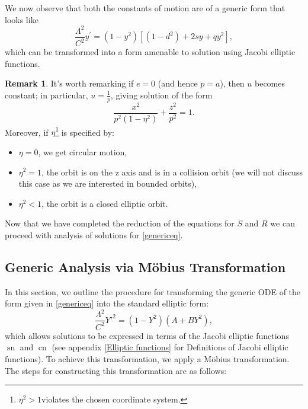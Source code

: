 \documentclass[12pt,oneside]{report}
\theoremstyle{definition}
\newtheorem{remark}{Remark}
\begin{document}
We now observe that both the constants of motion are of a generic form that looks like 
\begin{equation}\label{genericeq}
    \frac{\Lambda^{2}}{C^{2}}{y}^{\prime} = (1-y^{2}) \left[(1-d^{2})+2sy+qy^{2} \right],
\end{equation}
which can be transformed into a form amenable to solution using Jacobi elliptic functions.
\begin{remark}
    It's worth remarking if $e = 0$ (and hence $p=a$), then $u$ becomes constant; in particular, $u=\frac{1}{p}$, giving solution of the form
    $$\frac{x^{2}}{p^{2}(1-\eta^{2})}+\frac{z^{2}}{p^{2}} = 1 .$$
   Moreover, if $\eta$\footnote{$\eta^{2}>1$violates the chosen coordinate system.} is specified by:
    \begin{itemize}
        \item $\eta =0$, we get circular motion,
        \item $\eta^{2} =1$,  the orbit is on the z axis and is in a collision orbit (we will not discuss this case as we are interested in bounded orbits),
        \item $\eta^{2} < 1$, the orbit is a closed elliptic orbit.
    \end{itemize}
    

\end{remark}

Now that we have completed the reduction of the equations for $S$ and $R$ we can proceed with analysis of solutions for \autoref{genericeq}.

\subsection{Generic Analysis via Möbius Transformation}\label{Outline}

In this section, we outline the procedure for transforming the generic ODE of the form given in \autoref{genericeq} into the standard elliptic form:  
\begin{equation}\label{required_improved}
  \frac{\Lambda^{2}}{C^{2}}{Y'}^{2} = (1 - Y^{2})(A + B Y^{2}),
\end{equation}
which allows solutions to be expressed in terms of the Jacobi elliptic functions $\operatorname{sn}$ and $\operatorname{cn}$ (see appendix \ref{Elliptic functions} for Definitions of Jacobi elliptic functions). To achieve this transformation, we apply a Möbius transformation. The steps for constructing this transformation are as follows:  
\end{document}
